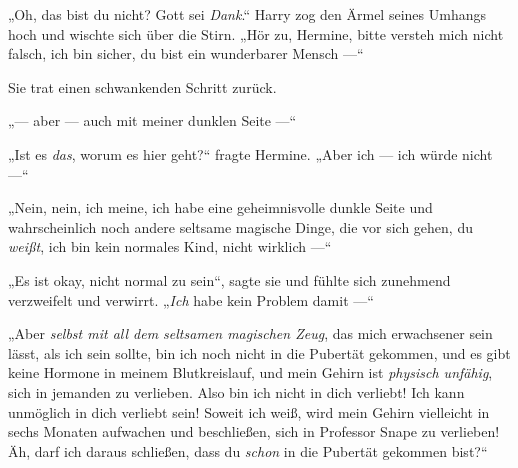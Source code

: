„Oh, das bist du nicht? Gott sei \emph{Dank}.“ Harry zog den Ärmel seines Umhangs hoch und wischte sich über die Stirn.
„Hör zu, Hermine, bitte versteh mich nicht falsch, ich bin sicher, du bist ein wunderbarer Mensch —“

Sie trat einen schwankenden Schritt zurück.

„— aber — auch mit meiner dunklen Seite —“

„Ist es \emph{das}, worum es hier geht?“ fragte Hermine.
„Aber ich — ich würde nicht —“

„Nein, nein, ich meine, ich habe eine geheimnisvolle dunkle Seite und wahrscheinlich noch andere seltsame magische Dinge, die vor sich gehen, du \emph{weißt}, ich bin kein normales Kind, nicht wirklich —“

„Es ist okay, nicht normal zu sein“, sagte sie und fühlte sich zunehmend verzweifelt und verwirrt.
„\emph{Ich} habe kein Problem damit —“

„Aber \emph{selbst mit all dem seltsamen magischen Zeug}, das mich erwachsener sein lässt, als ich sein sollte, bin ich noch nicht in die Pubertät gekommen, und es gibt keine Hormone in meinem Blutkreislauf, und mein Gehirn ist \emph{physisch unfähig}, sich in jemanden zu verlieben. Also bin ich nicht in dich verliebt! Ich kann unmöglich in dich verliebt sein! Soweit ich weiß, wird mein Gehirn vielleicht in sechs Monaten aufwachen und beschließen, sich in Professor Snape zu verlieben! Äh, darf ich daraus schließen, dass du \emph{schon} in die Pubertät gekommen bist?“

